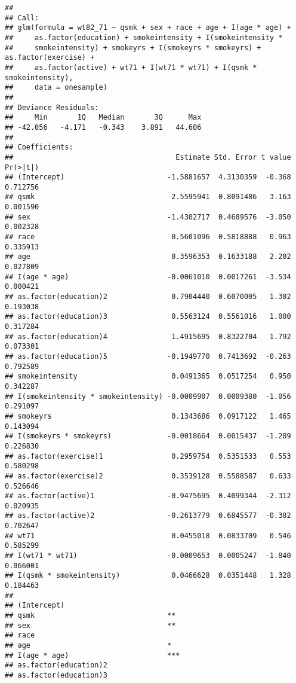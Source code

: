 \documentclass[10pt,]{book}
\begin{document}
\begin{verbatim}
## 
## Call:
## glm(formula = wt82_71 ~ qsmk + sex + race + age + I(age * age) + 
##     as.factor(education) + smokeintensity + I(smokeintensity * 
##     smokeintensity) + smokeyrs + I(smokeyrs * smokeyrs) + as.factor(exercise) + 
##     as.factor(active) + wt71 + I(wt71 * wt71) + I(qsmk * smokeintensity), 
##     data = onesample)
## 
## Deviance Residuals: 
##     Min       1Q   Median       3Q      Max  
## -42.056   -4.171   -0.343    3.891   44.606  
## 
## Coefficients:
##                                      Estimate Std. Error t value Pr(>|t|)
## (Intercept)                        -1.5881657  4.3130359  -0.368 0.712756
## qsmk                                2.5595941  0.8091486   3.163 0.001590
## sex                                -1.4302717  0.4689576  -3.050 0.002328
## race                                0.5601096  0.5818888   0.963 0.335913
## age                                 0.3596353  0.1633188   2.202 0.027809
## I(age * age)                       -0.0061010  0.0017261  -3.534 0.000421
## as.factor(education)2               0.7904440  0.6070005   1.302 0.193038
## as.factor(education)3               0.5563124  0.5561016   1.000 0.317284
## as.factor(education)4               1.4915695  0.8322704   1.792 0.073301
## as.factor(education)5              -0.1949770  0.7413692  -0.263 0.792589
## smokeintensity                      0.0491365  0.0517254   0.950 0.342287
## I(smokeintensity * smokeintensity) -0.0009907  0.0009380  -1.056 0.291097
## smokeyrs                            0.1343686  0.0917122   1.465 0.143094
## I(smokeyrs * smokeyrs)             -0.0018664  0.0015437  -1.209 0.226830
## as.factor(exercise)1                0.2959754  0.5351533   0.553 0.580298
## as.factor(exercise)2                0.3539128  0.5588587   0.633 0.526646
## as.factor(active)1                 -0.9475695  0.4099344  -2.312 0.020935
## as.factor(active)2                 -0.2613779  0.6845577  -0.382 0.702647
## wt71                                0.0455018  0.0833709   0.546 0.585299
## I(wt71 * wt71)                     -0.0009653  0.0005247  -1.840 0.066001
## I(qsmk * smokeintensity)            0.0466628  0.0351448   1.328 0.184463
##                                       
## (Intercept)                           
## qsmk                               ** 
## sex                                ** 
## race                                  
## age                                *  
## I(age * age)                       ***
## as.factor(education)2                 
## as.factor(education)3                 

\end{verbatim}
\end{document}
